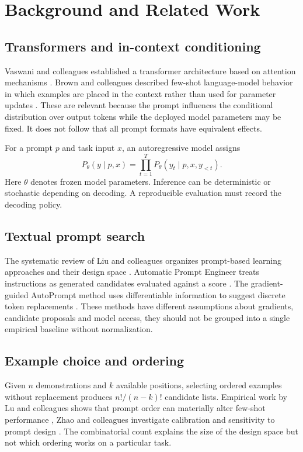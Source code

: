 \documentclass[12pt,a4paper,oneside]{report}
\begin{document}
\chapter{Background and Related Work}
\section{Transformers and in-context conditioning}
Vaswani and colleagues established a transformer architecture based on attention mechanisms \cite{vaswani2017}. Brown and colleagues described few-shot language-model behavior in which examples are placed in the context rather than used for parameter updates \cite{brown2020}. These are relevant because the prompt influences the conditional distribution over output tokens while the deployed model parameters may be fixed. It does not follow that all prompt formats have equivalent effects.

For a prompt $p$ and task input $x$, an autoregressive model assigns
\begin{equation}
P_{\theta}(y\mid p,x)=\prod_{t=1}^{T}P_{\theta}(y_t\mid p,x,y_{<t}).
\label{eq:auto}
\end{equation}
Here $\theta$ denotes frozen model parameters. Inference can be deterministic or stochastic depending on decoding. A reproducible evaluation must record the decoding policy.

\section{Textual prompt search}
The systematic review of Liu and colleagues organizes prompt-based learning approaches and their design space \cite{liu2023}. Automatic Prompt Engineer treats instructions as generated candidates evaluated against a score \cite{zhou2023}. The gradient-guided AutoPrompt method uses differentiable information to suggest discrete token replacements \cite{shin2020}. These methods have different assumptions about gradients, candidate proposals and model access, they should not be grouped into a single empirical baseline without normalization.

\section{Example choice and ordering}
Given $n$ demonstrations and $k$ available positions, selecting ordered examples without replacement produces $n!/(n-k)!$ candidate lists. Empirical work by Lu and colleagues shows that prompt order can materially alter few-shot performance \cite{lu2022}, Zhao and colleagues investigate calibration and sensitivity to prompt design \cite{zhao2021}. The combinatorial count explains the size of the design space but not which ordering works on a particular task.
\end{document}

